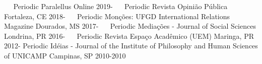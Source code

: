 \begin{cvhonors}
   \cvhonor
    {Periodic}
    {Paralellus}
    {Online}
    {2019-}
   \cvhonor
    {Periodic}
    {Revista Opinião Pública}
    {Fortaleza, CE}
    {2018-}
   \cvhonor
    {Periodic}
    {Monções: UFGD International Relations Magazine}
    {Dourados, MS}
    {2017-}
   \cvhonor
    {Periodic}
    {Mediações - Journal of Social Sciences}
    {Londrina, PR}
    {2016-}
   \cvhonor
    {Periodic}
    {Revista Espaço Acadêmico (UEM)}
    {Maringa, PR}
    {2012-}
  \cvhonor
    {Periodic}
    {Idéias - Journal of the Institute of Philosophy and Human Sciences of UNICAMP}
    {Campinas, SP}
    {2010-2010}
\end{cvhonors}
